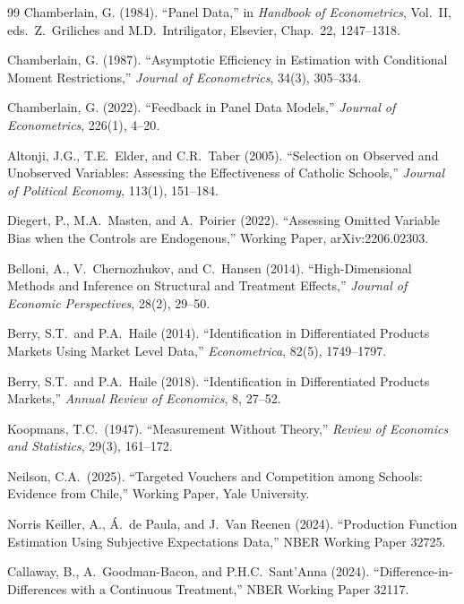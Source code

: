 \documentclass[11pt]{article}
\begin{document}
\begin{thebibliography}{99}
 Chamberlain, G. (1984). ``Panel Data,'' in \emph{Handbook of Econometrics}, Vol.~II, eds.\ Z.\ Griliches and M.D.\ Intriligator, Elsevier, Chap.~22, 1247--1318.

 Chamberlain, G. (1987). ``Asymptotic Efficiency in Estimation with Conditional Moment Restrictions,'' \emph{Journal of Econometrics}, 34(3), 305--334.

 Chamberlain, G. (2022). ``Feedback in Panel Data Models,'' \emph{Journal of Econometrics}, 226(1), 4--20.

 Altonji, J.G., T.E.\ Elder, and C.R.\ Taber (2005). ``Selection on Observed and Unobserved Variables: Assessing the Effectiveness of Catholic Schools,'' \emph{Journal of Political Economy}, 113(1), 151--184.

 Diegert, P., M.A.\ Masten, and A.\ Poirier (2022). ``Assessing Omitted Variable Bias when the Controls are Endogenous,'' Working Paper, arXiv:2206.02303.

 Belloni, A., V.\ Chernozhukov, and C.\ Hansen (2014). ``High-Dimensional Methods and Inference on Structural and Treatment Effects,'' \emph{Journal of Economic Perspectives}, 28(2), 29--50.

 Berry, S.T.\ and P.A.\ Haile (2014). ``Identification in Differentiated Products Markets Using Market Level Data,'' \emph{Econometrica}, 82(5), 1749--1797.

 Berry, S.T.\ and P.A.\ Haile (2018). ``Identification in Differentiated Products Markets,'' \emph{Annual Review of Economics}, 8, 27--52.

 Koopmans, T.C.\ (1947). ``Measurement Without Theory,'' \emph{Review of Economics and Statistics}, 29(3), 161--172.

 Neilson, C.A.\ (2025). ``Targeted Vouchers and Competition among Schools: Evidence from Chile,'' Working Paper, Yale University.

 Norris Keiller, A., \'A.\ de Paula, and J.\ Van Reenen (2024). ``Production Function Estimation Using Subjective Expectations Data,'' NBER Working Paper 32725.

 Callaway, B., A.\ Goodman-Bacon, and P.H.C.\ Sant'Anna (2024). ``Difference-in-Differences with a Continuous Treatment,'' NBER Working Paper 32117.


\end{thebibliography}
\end{document}
